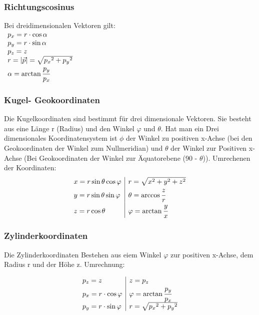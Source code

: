 \documentclass[a4paper,10pt]{scrartcl}
\begin{document}
            \subsubsection{Richtungscosinus}
                Bei dreidimensionalen Vektoren gilt: \\
                $\begin{array}{l}
                    p_x = r \cdot \cos \alpha \\
                    p_y = r \cdot \sin \alpha \\
                    p_z = z\\
                    r = |\vec p| = \sqrt{{p_x}^2 + {p_y}^2} \\
                    \alpha = \arctan \cfrac{p_y}{p_x}
                \end{array}$
            \subsubsection{Kugel- Geokoordinaten}
            Die Kugelkoordinaten sind bestimmt für drei dimensionale Vektoren. Sie besteht aus eine Länge r (Radius) und den Winkel $\varphi$ und $\theta$. Hat man ein Drei dimensionales
            Koordinatensystem ist $\phi$ der Winkel zu positiven x-Achse (bei den Geokoordinaten der Winkel zum Nullmeridian) und $\theta$ der Winkel zur Positiven x-Achse 
            (Bei Geokoordinaten der Winkel zur Äquatorebene (90 - $\theta$)). Umrechenen der Koordinaten:
            \[
                \begin{array}{l|l}
                    x = r \sin \theta \cos \varphi & r = \sqrt{x^2 + y^2 + z^2} \\
                    y = r \sin \theta \sin \varphi & \theta = \arccos \cfrac{z}{r} \\
                    z = r \cos \theta & \varphi = \arctan \cfrac{y}{x}
                \end{array}
            \]
            \subsubsection{Zylinderkoordinaten}
            Die Zylinderkoordinaten Bestehen aus eiem Winkel $\varphi$ zur positiven x-Achse, dem Radius r und der Höhe z. Umrechnung:

            \[
                \begin{array}{l|l}
                    p_z = z & z = p_z \\
                    p_x = r \cdot \cos \varphi &  \varphi = \arctan \cfrac{p_y}{p_x} \\
                    p_y = r \cdot \sin \varphi & r = \sqrt{{p_x}^2 + {p_y}^2}  
                \end{array}
            \]
            \newpage
\end{document}
